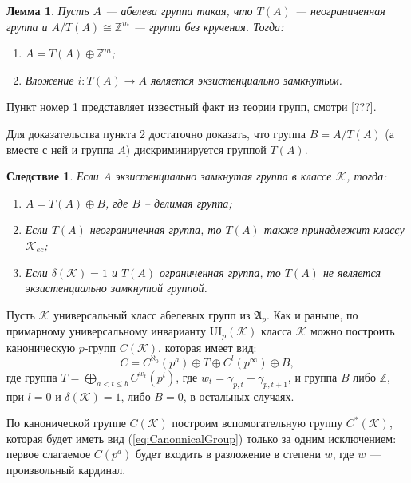 \documentclass[14pt]{extarticle} %
\newtheorem{lemma}{Лемма}[section]
\newtheorem{corollary}{Следствие}[section]
\def\proof{{\noindent{\bf Доказательство.}} }
\def\A{{\mathfrak{A}}}
\def\K{{\mathcal{K}}}
\def\Z{{\mathbb{Z}}}
\def\ui{{\mathrm{UI}}}
\begin{document}
\begin{lemma}
Пусть $A$ --- абелева группа такая, что $T(A)$ --- неограниченная группа и $A \big/ T(A) \cong \Z^m$ --- группа без кручения. Тогда:
\begin{enumerate}
\item $A = T(A) \oplus \Z^m$;
\item Вложение $i : T(A) \rightarrow A$ является экзистенциально замкнутым.
\end{enumerate}
\end{lemma}

\proof Пункт номер 1 представляет известный факт из теории групп, смотри [???]. 

Для доказательства пункта 2 достаточно доказать, что группа $B = A \big/ T(A)$ (а вместе с ней и группа $A$) дискриминируется группой $T(A)$.


\begin{corollary}
Если $A$ экзистенциально замкнутая группа в классе $\K$, тогда:
\begin{enumerate}
\item $A = T(A) \oplus B$, где $B$ -- делимая группа;
\item Если $T(A)$ неограниченная группа, то $T(A)$ также принадлежит классу $\K_{ec}$;
\item Если $\delta(\K) = 1$ и $T(A)$ ограниченная группа, то $T(A)$ не является экзистенциально замкнутой группой.
\end{enumerate}
\end{corollary}


Пусть $\K$ универсальный класс абелевых групп из $\A_p$. Как и раньше, по примарному универсальному инварианту $\ui_p(\K)$ класса $\K$ можно построить каноническую $p$-групп $C(\K)$, которая имеет вид:
\begin{equation}\label{eq:CanonnicalGroup}
 C = C^{\aleph_0}(p^a) \oplus T \oplus C^l(p^\infty) \oplus B,
 \end{equation}
где группа $T = \bigoplus\limits_{ a < t \leq b} C^{w_t}(p^t)$, где $w_t = \gamma_{p,t} - \gamma_{p,t+1}$, и группа $B$ либо $\Z$, при $l = 0$ и $\delta(\K) = 1$, либо $B = 0$, в остальных случаях.

По канонической группе $C(\K)$ построим вспомогательную группу $C^*(\K)$, которая будет иметь вид (\ref{eq:CanonnicalGroup}) только за одним исключением: первое слагаемое $C(p^a)$ будет входить в разложение в степени $w$, где $w$ --- произвольный кардинал.
\end{document}
